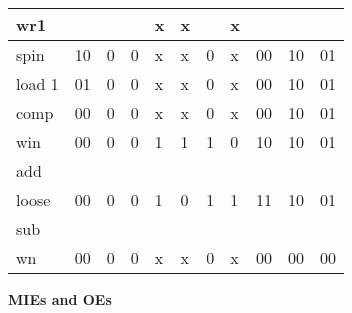 \begin{enumerate}
\begin{onlysolution}
{{\begin{tabular}{l|l|l|l|l|l|l|l|l|l|l}
                        wr1   &         &        &        & x          & x        &        &  x     &
                        &         &   \\ \hline
                        spin  & 10      & 0      &  0     & x          & x        &  0     &  x     & 00
                        &  10     & 01\\ \hline
                        load 1& 01      & 0      &  0     & x          & x        &  0     &  x     & 00
                        &  10     & 01\\ \hline
                        comp  & 00      & 0      &  0     & x          & x        &  0     &  x     & 00
                        &  10     & 01\\ \hline
                        win   & 00      & 0      &  0     & 1          & 1        &  1     &  0     & 10
                        &  10     & 01\\ \hline
                        add    &         &        &        &            &          &        &        &
                        &         &   \\ \hline
                        loose & 00      & 0      &  0     & 1          & 0        &  1     &  1     & 11
                        &  10     & 01\\ \hline
                        sub   &         &        &        &            &          &        &        &
                        &         &   \\ \hline
                        wn    & 00      & 0      &  0     & x          & x        &  0     &  x     & 00
                        &  00     & 00\\
                    \end{tabular}
                }

                \textbf{ MIEs and OEs}

}
\end{onlysolution}
\end{enumerate}
